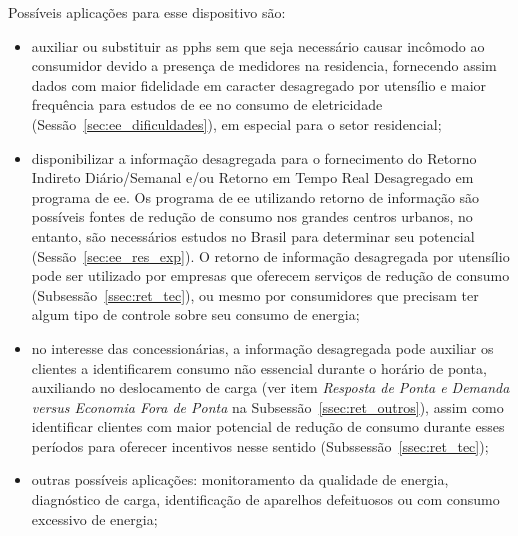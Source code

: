 Possíveis aplicações para esse dispositivo são: 

\begin{itemize}
\item auxiliar ou substituir as \glspl{pph} sem que seja necessário
causar incômodo ao consumidor devido a presença de medidores na
residencia, fornecendo assim dados com maior fidelidade em caracter
desagregado por utensílio e maior frequência para estudos de \gls{ee}
no consumo de eletricidade (Sessão~\ref{sec:ee_dificuldades}), em
especial para o setor residencial;
\item disponibilizar a informação desagregada para o fornecimento do
Retorno Indireto Diário/Semanal e/ou Retorno em Tempo Real Desagregado
em programa de \gls{ee}. Os programa de \gls{ee} utilizando retorno
de informação são possíveis fontes de redução de consumo nos grandes
centros urbanos, no entanto, são necessários estudos no Brasil para
determinar seu potencial (Sessão~\ref{sec:ee_res_exp}). O retorno de
informação desagregada por utensílio pode ser utilizado por empresas
que oferecem serviços de redução de consumo
(Subsessão~\ref{ssec:ret_tec}), ou mesmo por consumidores que precisam
ter algum tipo de controle sobre seu consumo de energia; \item no
interesse das concessionárias, a informação desagregada pode auxiliar
os clientes a identificarem consumo não essencial durante o horário de
ponta, auxiliando no deslocamento de carga (ver item \emph{Resposta de
Ponta e Demanda versus Economia Fora de Ponta} na
Subsessão~\ref{ssec:ret_outros}), assim como identificar clientes com
maior potencial de redução de consumo durante esses períodos para
oferecer incentivos nesse sentido (Subssessão~\ref{ssec:ret_tec}); 
\item outras possíveis aplicações: monitoramento da qualidade de
energia, diagnóstico de carga, identificação de aparelhos defeituosos
ou com consumo excessivo de energia;
\end{itemize}

